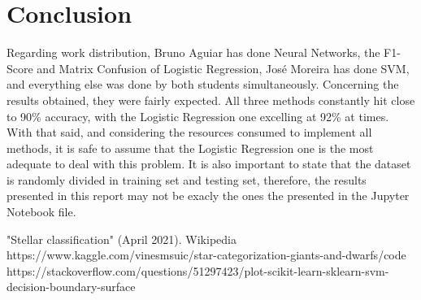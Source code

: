 \documentclass[conference]{IEEEtran}
\begin{document}
\section{Conclusion}
Regarding work distribution, Bruno Aguiar has done Neural Networks, the F1-Score and Matrix Confusion of Logistic Regression, José Moreira has done SVM, and everything else was done by both students simultaneously. Concerning the results obtained, they were fairly expected. All three methods constantly hit close to 90\% accuracy, with the Logistic Regression one excelling at 92\% at times. With that said, and considering the resources consumed to implement all methods, it is safe to assume that the Logistic Regression one is the most adequate to deal with this problem.
It is also important to state that the dataset is randomly divided in training set and testing set, therefore, the results presented in this report may not be exacly the ones the presented in the Jupyter Notebook file. 
\begin{thebibliography}{00}
"Stellar classification" (April 2021). Wikipedia 
 https://www.kaggle.com/vinesmsuic/star-categorization-giants-and-dwarfs/code
https://stackoverflow.com/questions/51297423/plot-scikit-learn-sklearn-svm-decision-boundary-surface
\end{thebibliography}

	
\end{document}
